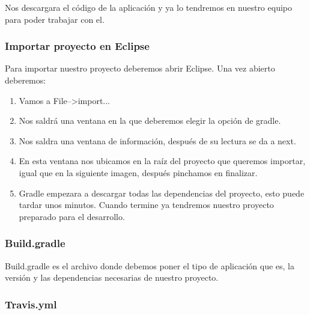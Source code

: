 
Nos descargara el código de la aplicación y ya lo tendremos en nuestro equipo para poder trabajar con el.

\subsubsection{Importar proyecto en Eclipse}\label{importar-proyecto-en-eclipse}

Para importar nuestro proyecto deberemos abrir Eclipse. Una vez abierto deberemos:

\begin{enumerate}
	\tightlist
	\item
	Vamos a File-->import...
	\item
	Nos saldrá una ventana en la que deberemos elegir la opción de gradle.
	
	
	\item
	Nos saldra una ventana de información, después de su lectura se da a next.
	
	\item
	En esta ventana nos ubicamos en la raíz del proyecto que queremos importar, igual que en la siguiente imagen, después pinchamos en finalizar.
	
	
	\item
	Gradle empezara a descargar todas las dependencias del proyecto, esto puede tardar unos minutos. Cuando termine ya tendremos nuestro proyecto preparado para el desarrollo.
		
	
	
\end{enumerate}

\subsubsection{Build.gradle}\label{buildgradle}

Build.gradle es el archivo donde debemos poner el tipo de aplicación que es, la versión y las dependencias necesarias de nuestro proyecto. \cite{gradle}

\subsubsection{Travis.yml}\label{buildgradle}

